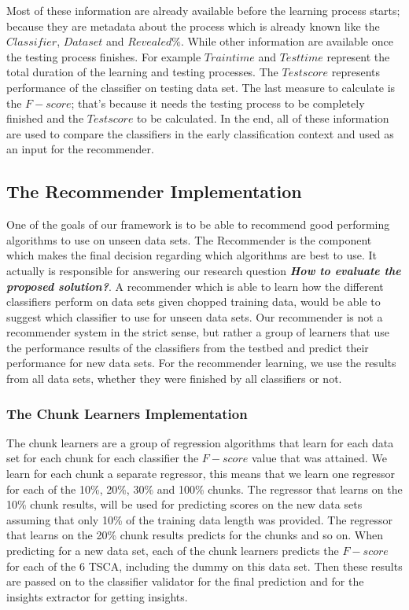 Most of these information are already available before the learning process starts; because they are metadata about the process which is already known like the $Classifier$, $Data set$ and $Revealed \%$.
While other information are available once the testing process finishes. For example $Train time$ and $Test time$ represent the total duration of the learning and testing processes.
The $Test score$ represents performance of the classifier on testing data set.
The last measure to calculate is the $F-score$; that's because it needs the testing process to be completely finished and the $Test score$ to be calculated.
In the end, all of these information are used to compare the classifiers in the early classification context and used as an input for the recommender.

\subsection{The Recommender Implementation}
\label{SubsectionRecommenderImplementation}
One of the goals of our framework is to be able to recommend good performing algorithms to use on unseen data sets.
The Recommender is the component which makes the final decision regarding which algorithms are best to use.
It actually is responsible for answering our research question \textbf{\textit{How to evaluate the proposed solution?}}.
A recommender which is able to learn how the different classifiers perform on data sets given chopped training data,
would be able to suggest which classifier to use for unseen data sets.
Our recommender is not a recommender system in the strict sense, but rather a group of learners that use the performance results of the classifiers from the testbed
and predict their performance for new data sets. For the recommender learning, we use the results from all data sets, whether they were finished by all classifiers or not.

\subsubsection*{The Chunk Learners Implementation}
\label{ChunkLearnersImplementation}
The chunk learners are a group of regression algorithms that learn for each data set for each chunk for each classifier the $F-score$ value that was attained.
We learn for each chunk a separate regressor, this means that we learn one regressor for each of the 10\%, 20\%, 30\% and 100\% chunks.
The regressor that learns on the 10\% chunk results, will be used for predicting scores on the new data sets assuming that only 10\% of the training data length was provided.
The regressor that learns on the 20\% chunk results predicts for the  chunks and so on.
When predicting for a new data set, each of the chunk learners predicts the $F-score$ for each of the 6 TSCA, including the dummy on this data set.
Then these results are passed on to the classifier validator for the final prediction and for the insights extractor for getting insights.

